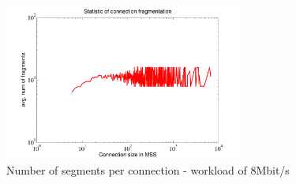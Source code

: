 \documentclass[preprint,12pt]{elsarticle}
\begin{document}

\begin{figure}[ht]
  \centering
  \includegraphics[width=0.7\textwidth]{./fig/wired/internal_dynamics/segment_8}
  \caption{Number of segments per connection - workload of 8Mbit/s}
  \label{fig:seg8}
\end{figure}
\end{document}
